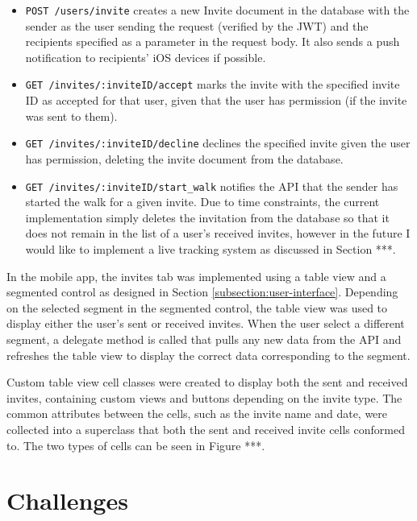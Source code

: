\begin{itemize}
  \item \verb|POST /users/invite| creates a new Invite document in the database with the sender as the user sending the request (verified by the JWT) and the recipients specified as a parameter in the request body. It also sends a push notification to recipients' iOS devices if possible.

  \item \verb|GET /invites/:inviteID/accept| marks the invite with the specified invite ID as accepted for that user, given that the user has permission (if the invite was sent to them).

  \item \verb|GET /invites/:inviteID/decline| declines the specified invite given the user has permission, deleting the invite document from the database.

  \item \verb|GET /invites/:inviteID/start_walk| notifies the API that the sender has started the walk for a given invite. Due to time constraints, the current implementation simply deletes the invitation from the database so that it does not remain in the list of a user's received invites, however in the future I would like to implement a live tracking system as discussed in Section ***.
\end{itemize}

In the mobile app, the invites tab was implemented using a table view and a segmented control as designed in Section \ref{subsection:user-interface}. Depending on the selected segment in the segmented control, the table view was used to display either the user's sent or received invites. When the user select a different segment, a delegate method is called that pulls any new data from the API and refreshes the table view to display the correct data corresponding to the segment.

Custom table view cell classes were created to display both the sent and received invites, containing custom views and buttons depending on the invite type. The common attributes between the cells, such as the invite name and date, were collected into a superclass that both the sent and received invite cells conformed to. The two types of cells can be seen in Figure ***.


\section{Challenges}


